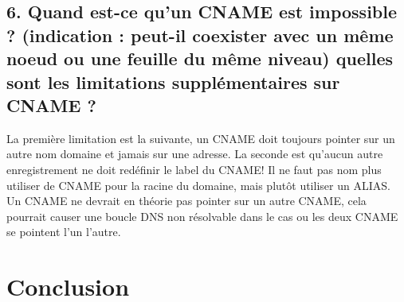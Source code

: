 \documentclass{article}
\begin{document}
\subsection*{6. Quand est-ce qu’un CNAME est impossible ? (indication : peut-il coexister avec un même noeud ou une feuille du même niveau) quelles sont les limitations supplémentaires sur CNAME ?}
La première limitation est la suivante, un CNAME\cite{CNAME} doit toujours pointer sur un autre nom domaine et jamais sur une adresse. La seconde est qu'aucun autre enregistrement ne doit redéfinir le label du CNAME! Il ne faut pas nom plus utiliser de CNAME pour la racine du domaine, mais plutôt utiliser un ALIAS\cite{ALIAS}.\\

Un CNAME ne devrait en théorie pas pointer sur un autre CNAME, cela pourrait causer une boucle DNS non résolvable dans le cas ou les deux CNAME se pointent l'un l'autre.\cite{cname-limitations}\\


\section{Conclusion}

\newpage
\printbibliography
\end{document}
